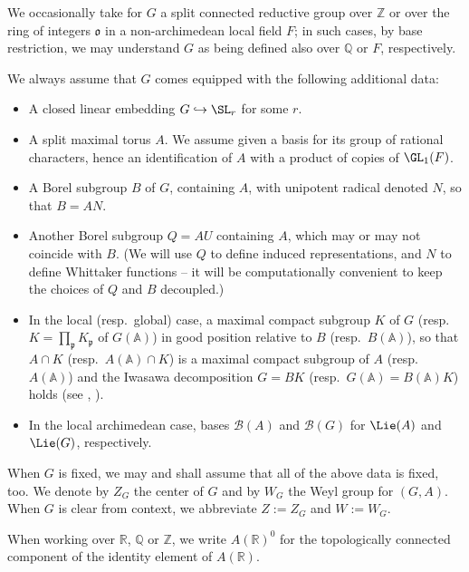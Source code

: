 We occasionally take for $G$ a split connected reductive group over $\mathbb{Z}$ or over the ring of integers $\mathfrak{o}$ in a non-archimedean local field $F$; in such cases, by base restriction, we may understand $G$ as being defined also over $\mathbb{Q}$ or $F$, respectively.


We always assume that $G$ comes equipped with the following additional data:
\begin{itemize}
\item A closed linear embedding $G \hookrightarrow \SL_r$ for some $r$.
\item A split maximal torus  $A$.  We assume given a basis for its group of rational characters, hence an identification of $A$ with a product of copies of $\GL_1(F)$.
\item A Borel subgroup $B$  of $G$, containing $A$, with unipotent radical denoted $N$, so that $B = A N$.
\item Another Borel subgroup $Q = A U$  containing $A$, which may or may not coincide with $B$.  (We will use $Q$ to define induced representations, and $N$ to define Whittaker functions -- it will be computationally convenient to keep the choices of $Q$ and $B$ decoupled.)
\item In the local (resp.\ global) case, a maximal compact subgroup  $K$ of $G$ (resp.\ $K = \prod_\mathfrak{p} K_\mathfrak{p}$ of $G(\mathbb{A})$) in good position relative to $B$ (resp.\ $B(\mathbb{A})$), so that $A \cap K$ (resp.\ $A(\mathbb{A}) \cap K$) is a maximal compact subgroup of $A$ (resp.\ $A(\mathbb{A})$) and the Iwasawa decomposition $G = B K$ (resp.\ $G(\mathbb{A}) = B(\mathbb{A}) K$) holds (see \cite[I.1.4]{MR1361168}, \cite[Thm A.1.1]{GetzHahn}).
\item In the local archimedean case,  bases $\mathcal{B}(A)$ and $\mathcal{B}(G)$ for $\Lie(A)$ and $\Lie(G)$, respectively.
\end{itemize}
When $G$ is fixed, we may and shall assume that all of the above data is fixed, too.  We denote by $Z_G$ the center of $G$ and by $W_G$ the Weyl group for $(G,A)$.  When $G$ is clear from context, we abbreviate $Z := Z_G$ and $W := W_G$.

When working over $\mathbb{R}$, $\mathbb{Q}$ or $\mathbb{Z}$, we write $A(\mathbb{R})^0$  for the topologically connected component of the identity element of $A(\mathbb{R})$.

